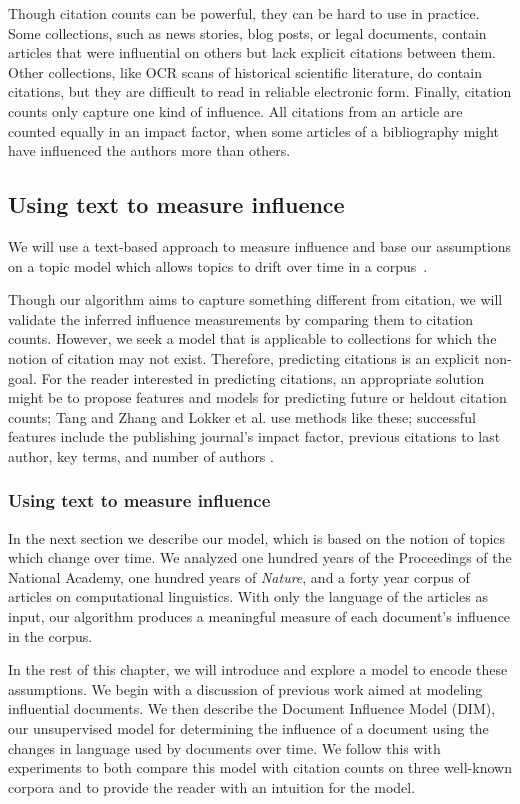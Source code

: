Though citation counts can be powerful, they can be hard to use in
practice.  Some collections, such as news stories, blog posts, or
legal documents, contain articles that were influential on others but
lack explicit citations between them.  Other collections, like OCR
scans of historical scientific literature, do contain citations, but
they are difficult to read in reliable electronic form.  Finally,
citation counts only capture one kind of influence.  All citations
from an article are counted equally in an impact factor, when some
articles of a bibliography might have influenced the authors more than
others.

\subsection*{Using text to measure influence}

We will use a text-based approach to measure influence and base our
assumptions on a topic model which allows topics to drift over time in
a corpus~\cite{blei:2006}.

Though our algorithm aims to capture something different from
citation, we will validate the inferred influence measurements by
comparing them to citation counts.  However, we seek a model that is
applicable to collections for which the notion of citation may not
exist.  Therefore, predicting citations is an explicit non-goal.  For
the reader interested in predicting citations, an appropriate solution
might be to propose features and models for predicting future or
heldout citation counts; Tang and Zhang \cite{tang:2009} and Lokker et
al. \cite{lokker:2008} use methods like these; successful features
include the publishing journal's impact factor, previous citations to
last author, key terms, and number of authors
\cite{tang:2009,lokker:2008}.

\subsubsection*{Using text to measure influence}

In the next section we describe our model, which is based on the
notion of topics which change over time.  We analyzed one hundred
years of the Proceedings of the National Academy, one hundred years of
\textit{Nature}, and a forty year corpus of articles on computational
linguistics.  With only the language of the articles as input, our
algorithm produces a meaningful measure of each document's influence
in the corpus.

In the rest of this chapter, we will introduce and explore a model to
encode these assumptions.  We begin with a discussion of previous work
aimed at modeling influential documents.  We then describe the
Document Influence Model (DIM), our unsupervised model for determining the
influence of a document using the changes in language used by
documents over time.  We follow this with experiments to both compare
this model with citation counts on three well-known corpora and to
provide the reader with an intuition for the model.
